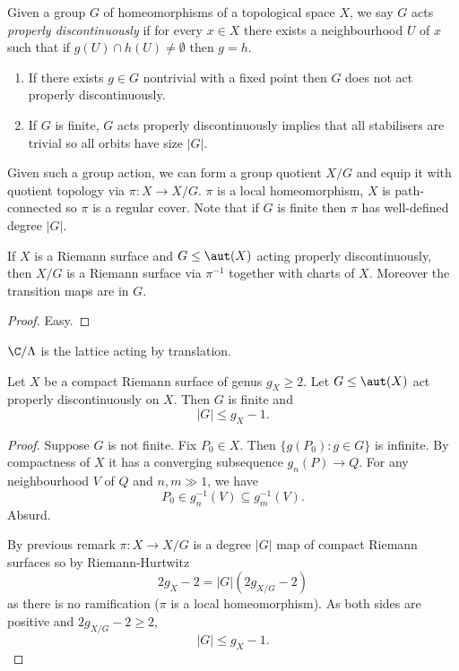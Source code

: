 \documentclass[a4paper]{article}
\begin{document}
\begin{definition}
  Given a group \(G\) of homeomorphisms of a topological space \(X\), we say \(G\) acts \emph{properly discontinuously} if for every \(x \in X\) there exists a neighbourhood \(U\) of \(x\) such that if \(g(U) \cap h(U) \neq \emptyset\) then \(g = h\).
\end{definition}

\begin{remark}\leavevmode
  \begin{enumerate}
  \item If there exists \(g \in G\) nontrivial with a fixed point then \(G\) does not act properly discontinuously.
  \item If \(G\) is finite, \(G\) acts properly discontinuously implies that all stabilisers are trivial so all orbits have size \(|G|\).
  \end{enumerate}
\end{remark}

Given such a group action, we can form a group quotient \(X/G\) and equip it with quotient topology via \(\pi: X \to X/G\). \(\pi\) is a local homeomorphism, \(X\) is path-connected so \(\pi\) is a regular cover. Note that if \(G\) is finite then \(\pi\) has well-defined degree \(|G|\).

\begin{lemma}
  If \(X\) is a Riemann surface and \(G \leq \aut(X)\) acting properly discontinuously, then \(X/G\) is a Riemann surface via \(\pi^{-1}\) together with charts of \(X\). Moreover the transition maps are in \(G\).
\end{lemma}

\begin{proof}
  Easy.
\end{proof}

\begin{eg}
  \(\C/\Lambda\) is the lattice acting by translation.
\end{eg}

\begin{proposition}[Hurwitz]
  Let \(X\) be a compact Riemann surface of genus \(g_X \geq 2\). Let \(G \leq \aut(X)\) act properly discontinuously on \(X\). Then \(G\) is finite and
  \[
    |G| \leq g_X - 1.
  \]
\end{proposition}

\begin{proof}
  Suppose \(G\) is not finite. Fix \(P_0 \in X\). Then \(\{g(P_0): g \in G\}\) is infinite. By compactness of \(X\) it has a converging subsequence \(g_n(P) \to Q\). For any neighbourhood \(V\) of \(Q\) and \(n, m \gg 1\), we have
  \[
    P_0 \in g_n^{-1}(V) \subseteq g_m^{-1}(V).
  \]
  Absurd.

  By previous remark \(\pi: X \to X/G\) is a degree \(|G|\) map of compact Riemann surfaces so by Riemann-Hurtwitz
  \[
    2g_X - 2 = |G| (2g_{X/G} - 2)
  \]
  as there is no ramification (\(\pi\) is a local homeomorphism). As both sides are positive and \(2g_{X/G} - 2 \geq 2\),
  \[
    |G| \leq g_X - 1.
  \]
\end{proof}
\end{document}
